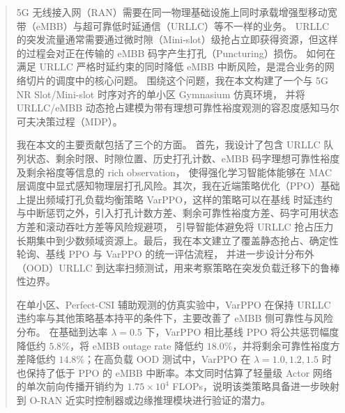\documentclass[
  type   = bachelor,
  degree = academic,
  fontset = fandol,
]{njuthesis}
\begin{document}
\maketitle
\raggedbottom

\begin{abstract}
5G 无线接入网（RAN）需要在同一物理基础设施上同时承载增强型移动宽带（eMBB）与超可靠低时延通信（URLLC）等不一样的业务。
URLLC 的突发流量通常需要通过微时隙（Mini-slot）级抢占立即获得资源，但这样的过程会对正在传输的 eMBB 码字产生打孔（Puncturing）损伤。
如何在满足 URLLC 严格时延约束的同时降低 eMBB 中断风险，是混合业务的网络切片的调度中的核心问题。
围绕这个问题，我在本文构建了一个与 5G NR Slot/Mini-slot 时序对齐的单小区 Gymnasium 仿真环境，
并将 URLLC/eMBB 动态抢占建模为带有理想可靠性裕度观测的容忍度感知马尔可夫决策过程（MDP）。

我在本文的主要贡献包括了三个的方面。
首先，我设计了包含 URLLC 队列状态、剩余时限、时隙位置、历史打孔计数、eMBB 码字理想可靠性裕度及剩余裕度等信息的 rich observation，
使得强化学习智能体能够在 MAC 层调度中显式感知物理层打孔风险。其次，我在近端策略优化（PPO）基础上提出频域打孔负载均衡策略 VarPPO，这样的策略可以在基线
时延违约与中断惩罚之外，引入打孔计数方差、剩余可靠性裕度方差、码字可用状态方差和滚动吞吐方差等风险规避项，
引导智能体避免将 URLLC 抢占压力长期集中到少数频域资源上。最后，我在本文建立了覆盖静态抢占、确定性轮询、基线 PPO 与 VarPPO 的统一评估流程，
并进一步设计分布外（OOD）URLLC 到达率扫频测试，用来考察策略在突发负载迁移下的鲁棒性边界。

在单小区、Perfect-CSI 辅助观测的仿真实验中，VarPPO 在保持 URLLC 违约率与其他策略基本持平的条件下，主要改善了 eMBB 侧可靠性与风险分布。
在基础到达率 \(\lambda=0.5\) 下，VarPPO 相比基线 PPO 将公共惩罚幅度降低约 \(5.8\%\)，将 eMBB outage rate 降低约 \(18.0\%\)，并将剩余可靠性裕度方差降低约 \(14.8\%\)；在高负载 OOD 测试中，VarPPO 在 \(\lambda=1.0,1.2,1.5\) 时也保持了低于 PPO 的 eMBB 中断率。本文同时估算了轻量级 Actor 网络的单次前向传播开销约为 \(1.75\times10^4\) FLOPs，说明该类策略具备进一步映射到 O-RAN 近实时控制器或边缘推理模块进行验证的潜力。
\end{abstract}
\end{document}
